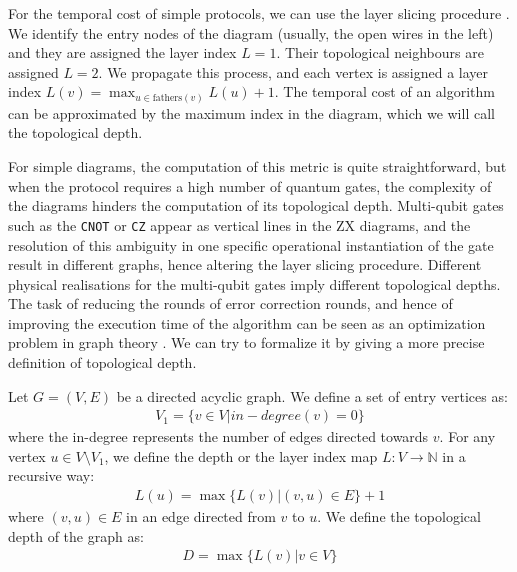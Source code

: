 \documentclass[12pt, twoside, openany]{book}
\begin{document}
For the temporal cost of simple protocols, we can use the layer slicing procedure \cite{zhou2026topolslatticesurgerycompilation}. We identify the entry nodes of the diagram (usually, the open wires in the left) and they are assigned the layer index $L = 1$. Their topological neighbours are assigned $L=2$. We propagate this process, and each vertex is assigned a layer index $L(v) = \max _{u \in \text{fathers}(v)} L(u) + 1$.  The temporal cost of an algorithm can be approximated by the maximum index in the diagram, which we will call the topological depth. 

For simple diagrams, the computation of this metric is quite straightforward, but when the protocol requires a high number of quantum gates, the complexity of the diagrams hinders the computation of its topological depth. Multi-qubit gates such as the \texttt{CNOT} or \texttt{CZ} appear as vertical lines in the ZX diagrams, and the resolution of this ambiguity in one specific operational instantiation of the gate result in different graphs, hence altering the layer slicing procedure. Different physical realisations for the multi-qubit gates imply different topological depths. The task of reducing the rounds of error correction rounds, and hence of improving the execution time of the algorithm can be seen as an optimization problem in graph theory \cite{v1983data}. We can try to formalize it by giving a more precise definition of topological depth.

\begin{definition}
    Let $G = (V,E)$ be a directed acyclic graph. We define a set of entry vertices as:
    \begin{align*}
        V_1 = \{ v \in V | in-degree(v) = 0\}
    \end{align*}
    where the in-degree represents the number of edges directed towards $v$. For any vertex $u \in V \setminus V_1$, we define the depth or the layer index map $L: V \rightarrow \mathbb{N}$ in a recursive way:
    \begin{align*}
        L(u) = \max\{L(v) | (v, u) \in E\} + 1
    \end{align*}
    where $(v,u)\in E $ in an edge directed from $v$ to $u$. We define the topological depth of the graph as:
    \begin{align*}
        D = \max \{L(v) | v \in V\}
    \end{align*}
    
\end{definition}
\end{document}
